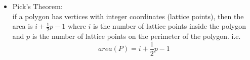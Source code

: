 \begin{itemize}[leftmargin=*]
\setlength\itemsep{0.2em}
\item Pick's Theorem:\\
if a polygon has vertices with integer coordinates (lattice points), then the area is $i+\frac{1}{2}p−1$ where $i$ is the number of lattice points inside the polygon and $p$ is the number of lattice points on the perimeter of the polygon. i.e.
$$area(P)=i+\frac{1}{2}p-1$$

\end{itemize}